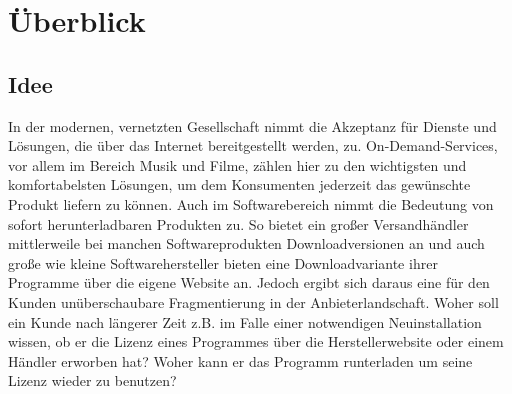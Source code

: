 \chapter{Überblick}

\section{Idee}

In der modernen, vernetzten Gesellschaft nimmt die Akzeptanz für Dienste und Lösungen, die über das Internet bereitgestellt werden, zu. On-Demand-Services, vor allem im Bereich Musik und Filme, zählen hier zu den wichtigsten und komfortabelsten Lösungen, um dem Konsumenten jederzeit das gewünschte Produkt liefern zu können. Auch im Softwarebereich nimmt die Bedeutung von sofort herunterladbaren Produkten zu. So bietet ein großer Versandhändler mittlerweile bei manchen Softwareprodukten Downloadversionen an und auch große wie kleine Softwarehersteller bieten eine Downloadvariante ihrer Programme über die eigene Website an. Jedoch ergibt sich daraus eine für den Kunden unüberschaubare Fragmentierung in der Anbieterlandschaft. Woher soll ein Kunde nach längerer Zeit z.B. im Falle einer notwendigen Neuinstallation wissen, ob er die Lizenz eines Programmes über die Herstellerwebsite oder einem Händler erworben hat? Woher kann er das Programm runterladen um seine Lizenz wieder zu benutzen?

